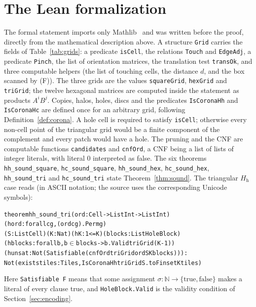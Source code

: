\documentclass[10pt,a4paper]{article}
\theoremstyle{definition}
\theoremstyle{remark}
\newcommand{\Hh}{H_{\mathrm h}}
\newcommand{\lean}[1]{\texttt{#1}}
\begin{document}
\section{The Lean formalization}
\label{sec:lean}
The formal statement imports only Mathlib~\cite{Mathlib} and was written before the
proof, directly from the mathematical description above. A structure
\lean{Grid} carries the fields of Table~\ref{tab:grids}: a predicate
\lean{isCell}, the relations \lean{Touch} and \lean{EdgeAdj}, a predicate
\lean{Pinch}, the list of orientation matrices, the translation test
\lean{transOk}, and three computable helpers (the list of touching cells,
the distance $d$, and the box scanned by (F)). The three grids are the
values \lean{squareGrid}, \lean{hexGrid} and \lean{triGrid}; the twelve
hexagonal matrices are computed inside the statement as products
$A^iB^j$. Copies, halos, holes, discs and the predicates
\lean{IsCoronaHh} and \lean{IsCoronaHc} are defined once for an arbitrary
grid, following Definition~\ref{def:corona}. A hole cell is required to
satisfy \lean{isCell}; otherwise every non-cell point of the triangular
grid would be a finite component of the complement and every patch would
have a hole. The pruning and the CNF are computable functions
\lean{candidates} and \lean{cnfOrd}, a CNF being a list of lists of
integer literals, with literal $0$ interpreted as false. The six theorems
\lean{hh\_sound\_square}, \lean{hc\_sound\_square}, \lean{hh\_sound\_hex},
\lean{hc\_sound\_hex}, \lean{hh\_sound\_tri} and \lean{hc\_sound\_tri}
state Theorem~\ref{thm:sound}. The triangular $\Hh$ case reads (in ASCII
notation; the source uses the corresponding Unicode symbols):
{\small
\begin{alltt}
theorem hh_sound_tri (ord : Cell -> List Int -> List Int)
    (hord : forall c g, (ord c g).Perm g)
    (S : List Cell) (K : Nat) (hK : 1 <= K) (blocks : List HoleBlock)
    (hblocks : forall b, b \(\in\) blocks -> b.Valid triGrid (K - 1))
    (hunsat : Not (Satisfiable (cnfOrd triGrid ord S K blocks))) :
    Not (exists tiles : Tiles, IsCoronaHh triGrid S.toFinset K tiles)
\end{alltt}}
\noindent Here \lean{Satisfiable F} means that some assignment
$\sigma:\mathbb N\to\{\mathrm{true},\mathrm{false}\}$ makes a literal of
every clause true, and \lean{HoleBlock.Valid} is the validity condition of
Section~\ref{sec:encoding}.
\end{document}
